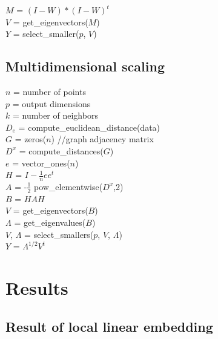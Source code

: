 \documentclass[a0,portrait]{a0poster}
\begin{document}
\begin{multicols}{3}
    $M$ = $(I-W) * (I-W)^t$\\
    $V$ = get\_eigenvectors($M$)\\
    $Y$ = select\_smaller($p$, $V$)

    \subsection*{Multidimensional scaling}

    $n$ = number of points\\
    $p$ = output dimensions\\
    $k$ = number of neighbors\\

    $D_e$ = compute\_euclidean\_distance(data)\\
    $G$ = zeros($n$) //graph adjacency matrix\\

    $D^x$ = compute\_distances($G$)\\

    $e$ = vector\_ones($n$)\\
    $H$ = $I - \frac{1}{n} e e^t$\\
    $A$ = -$\frac{1}{2}$ pow\_elementwise($D^x$,2)\\
    $B$ = $HAH$\\
    $V$ = get\_eigenvectors($B$)\\
    $\Lambda$ = get\_eigenvalues($B$)\\
    $V$, $\Lambda$ = select\_smallers($p$, $V$, $\Lambda$)\\
    $Y$ = $\Lambda^{1/2} V^t$

    \section*{Results}

    \subsection*{Result of local linear embedding}


\end{multicols}
\end{document}
